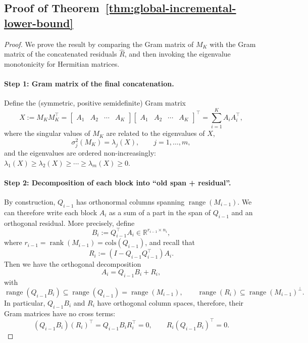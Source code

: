 \documentclass[10pt]{article} %
\begin{document}
\subsection{Proof of Theorem~\ref{thm:global-incremental-lower-bound}}

\label{appendix:proof-res-thm}

\begin{proof}
We prove the result by comparing the Gram matrix of $M_K$ with the Gram
matrix of the concatenated residuals $\widehat{R}$, and then invoking the
eigenvalue monotonicity for Hermitian matrices.

\paragraph{Step 1: Gram matrix of the final concatenation.}
Define the (symmetric, positive semidefinite) Gram matrix
\[
  X := M_K M_K^\top
  =
  \begin{bmatrix}
    A_1 & A_2 & \cdots & A_K
  \end{bmatrix}
  \begin{bmatrix}
    A_1 & A_2 & \cdots & A_K
  \end{bmatrix}^\top
  = \sum_{i=1}^K A_i A_i^\top,
\]
where the singular values of $M_K$ are related to the eigenvalues of $X$,
\[
  \sigma_j^2(M_K) = \lambda_j(X), \qquad j=1,\dots,m,
\]
and the eigenvalues are ordered non-increasingly:
$\lambda_1(X)\ge\lambda_2(X)\ge\cdots\ge\lambda_m(X)\ge 0$.

\paragraph{Step 2: Decomposition of each block into ``old span + residual''.}
By construction, $Q_{i-1}$ has orthonormal columns spanning
$\operatorname{range}(M_{i-1})$. We can therefore write each block $A_i$ as
a sum of a part in the span of $Q_{i-1}$ and an orthogonal residual. More
precisely, define
\[
  B_i := Q_{i-1}^\top A_i \in \mathbb{R}^{r_{i-1}\times n_i},
\]
where $r_{i-1} = \operatorname{rank}(M_{i-1}) = \mathrm{cols}(Q_{i-1})$, and
recall that
\[
  R_i := (I - Q_{i-1}Q_{i-1}^\top) A_i.
\]
Then we have the orthogonal decomposition
\[
  A_i = Q_{i-1} B_i + R_i,
\]
with
\[
  \operatorname{range}(Q_{i-1}B_i) \subseteq \operatorname{range}(Q_{i-1})
  = \operatorname{range}(M_{i-1}), 
  \qquad
  \operatorname{range}(R_i) \subseteq \operatorname{range}(M_{i-1})^\perp.
\]
In particular, $Q_{i-1}B_i$ and $R_i$ have orthogonal column spaces, therefore,
their Gram matrices have no cross terms:
\[
  (Q_{i-1}B_i)(R_i)^\top
  = Q_{i-1} B_i R_i^\top
  = 0,
  \qquad
  R_i (Q_{i-1}B_i)^\top = 0.
\]


\end{proof}
\end{document}
